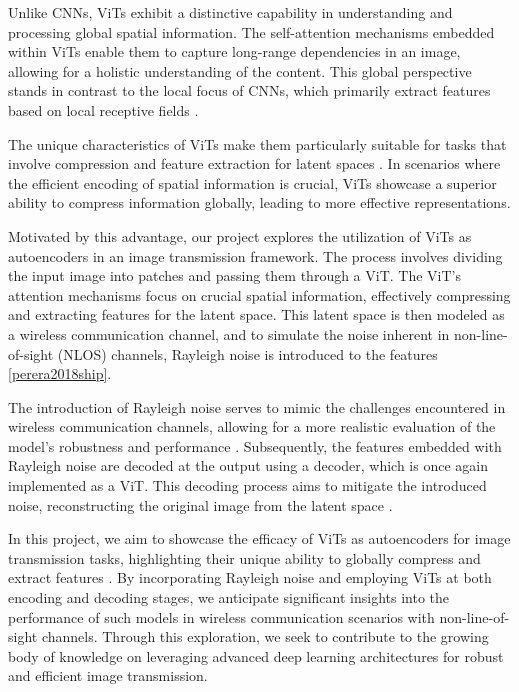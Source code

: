 \documentclass[10pt,twocolumn]{IEEEtran}
\begin{document}
Unlike CNNs, ViTs exhibit a distinctive capability in understanding and processing global spatial information. The self-attention mechanisms embedded within ViTs enable them to capture long-range dependencies in an image, allowing for a holistic understanding of the content. This global perspective stands in contrast to the local focus of CNNs, which primarily extract features based on local receptive fields \cite{letizia2021capacity}.

The unique characteristics of ViTs make them particularly suitable for tasks that involve compression and feature extraction for latent spaces \cite{chandar2021communication}. In scenarios where the efficient encoding of spatial information is crucial, ViTs showcase a superior ability to compress information globally, leading to more effective representations.

Motivated by this advantage, our project explores the utilization of ViTs as autoencoders in an image transmission framework. The process involves dividing the input image into patches and passing them through a ViT. The ViT's attention mechanisms focus on crucial spatial information, effectively compressing and extracting features for the latent space. This latent space is then modeled as a wireless communication channel, and to simulate the noise inherent in non-line-of-sight (NLOS) channels, Rayleigh noise is introduced to the features \ref{perera2018ship}.

The introduction of Rayleigh noise serves to mimic the challenges encountered in wireless communication channels, allowing for a more realistic evaluation of the model's robustness and performance \cite{zebang2019densely}. Subsequently, the features embedded with Rayleigh noise are decoded at the output using a decoder, which is once again implemented as a ViT. This decoding process aims to mitigate the introduced noise, reconstructing the original image from the latent space \cite{letizia2020capacity}.

In this project, we aim to showcase the efficacy of ViTs as autoencoders for image transmission tasks, highlighting their unique ability to globally compress and extract features \cite{zhang2019optimally}. By incorporating Rayleigh noise and employing ViTs at both encoding and decoding stages, we anticipate significant insights into the performance of such models in wireless communication scenarios with non-line-of-sight channels. Through this exploration, we seek to contribute to the growing body of knowledge on leveraging advanced deep learning architectures for robust and efficient image transmission.
\end{document}
